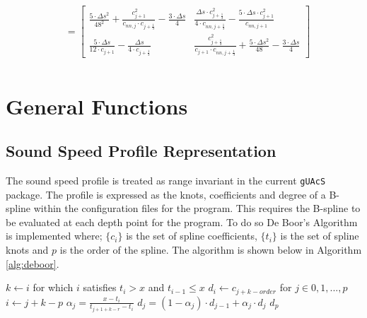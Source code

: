 \documentclass{article}
\begin{document}
\begin{align*}
      &= \begin{bmatrix} \frac{5\cdot\Delta s^2}{48^2} + \frac{c_{j+1}^2}{c_{nn, j}\cdot c_{j+\frac{1}{3}}} - \frac{3\cdot\Delta s}{4} & \frac{\Delta s\cdot c^2_{j+\frac{1}{3}}}{4\cdot c_{nn, j+\frac{1}{3}}} - \frac{5\cdot\Delta s\cdot c^2_{j+1}}{c_{nn, j+1}} \\ \frac{5\cdot\Delta s}{12\cdot c_{j+1}} - \frac{\Delta s}{4\cdot c_{j+\frac{1}{3}}} & \frac{c^2_{j+\frac{1}{3}}}{c_{j+1}\cdot c_{nn, j+\frac{1}{3}}} + \frac{5\cdot\Delta s^2}{48} - \frac{3\cdot\Delta s}{4} \end{bmatrix}\\
\end{align*}

\section{General Functions}
\subsection{Sound Speed Profile Representation}
The sound speed profile is treated as range invariant in the current \texttt{gUAcS} package. The profile is expressed as the knots, coefficients and degree of a B-spline within the configuration files for the program. This requires the B-spline to be evaluated at each depth point for the program. To do so De Boor's Algorithm is implemented where; $\{c_{i}\}$ is the set of spline coefficients, $\{t_{i}\}$ is the set of spline knots and $p$ is the order of the spline. The algorithm is shown below in Algorithm \ref{alg:deboor}.
\begin{algorithm}[H]
  \label{alg:deboor}
  \caption{De Boor's Algorithm}
  \begin{algorithmic}
    \State $k\gets i$ for which $i$ satisfies $t_{i} > x$ and $t_{i-1} \leq x$
    \State $d_i\gets c_{j + k -order}$ for $j\in{0,1,...,p}$
        \State $i\gets j + k - p$
        \State $\alpha_j = \frac{x - t_i}{t_{j + 1 + k - r} - t_{i}}$
        \State $d_j = (1 - \alpha_j)\cdot d_{j-1} + \alpha_j\cdot d_{j}$
      \EndFor
    \EndFor
    \Return $d_{p}$
  \end{algorithmic}
\end{algorithm}


\nocite{*}
\printbibliography
\end{document}
